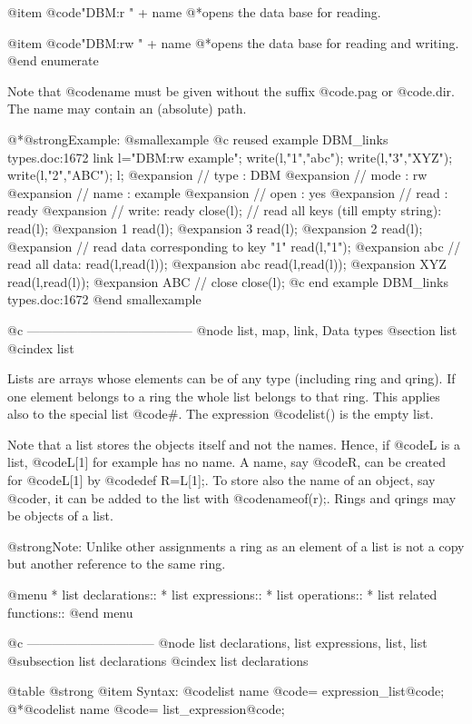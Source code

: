 {{{{{{@item @code{"DBM:r "} + name
@*opens the data base for reading.

@item @code{"DBM:rw "} + name
@*opens the data base for reading and writing.
@end enumerate

Note that @code{name} must be given without the suffix @code{.pag} or
@code{.dir}. The name may contain an (absolute) path.

@*@strong{Example:}
@smallexample
@c reused example DBM_links types.doc:1672 
  link l="DBM:rw example";
  write(l,"1","abc");
  write(l,"3","XYZ");
  write(l,"2","ABC");
  l;
@expansion{} // type : DBM
@expansion{} // mode : rw
@expansion{} // name : example
@expansion{} // open : yes
@expansion{} // read : ready
@expansion{} // write: ready
  close(l);
  // read all keys (till empty string):
  read(l);
@expansion{} 1
  read(l);
@expansion{} 3
  read(l);
@expansion{} 2
  read(l);
@expansion{} 
  // read data corresponding to key "1"
  read(l,"1");
@expansion{} abc
  // read all data:
  read(l,read(l));
@expansion{} abc
  read(l,read(l));
@expansion{} XYZ
  read(l,read(l));
@expansion{} ABC
  // close
  close(l);
@c end example DBM_links types.doc:1672
@end smallexample

@c ---------------------------------------
@node list, map, link, Data types
@section list
@cindex list

Lists are arrays whose elements can be of any type (including ring and
qring). If one element belongs to a ring the whole list belongs to that
ring. This applies also to the special list @code{#}. The expression
@code{list()} is the empty list.

Note that a list stores the objects itself and not the names.  Hence, if
@code{L} is a list, @code{L[1]} for example has no name.  A name, say
@code{R}, can be created for @code{L[1]} by @code{def R=L[1];}. To store
also the name of an object, say @code{r}, it can be added to the list
with @code{nameof(r);}. Rings and qrings may be objects of a list.

@strong{Note}: Unlike other assignments a ring as an element of a list
is not a copy but another reference to the same ring.

@menu
* list declarations::
* list expressions::
* list operations::
* list related functions::
@end menu

@c ------------------------------
@node list declarations, list expressions, list, list
@subsection list declarations
@cindex list declarations

@table @strong
@item Syntax:
@code{list} name @code{=} expression_list@code{;}
@*@code{list} name @code{=} list_expression@code{;}

}}}}}}
